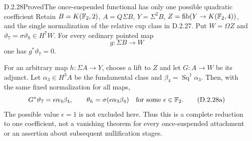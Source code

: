 \begin{claim}{D.2.28}{Proved}{The once-suspended functional has only one possible quadratic coefficient}
Retain $B=K(\mathbb F_2,2)$, $A=Q\Sigma B$, $Y=\Sigma^2B$,
$Z=\operatorname{fib}(Y\to K(\mathbb F_2,4))$, and the single
normalization of the relative cup class in \textup{D.2.27}.
Put $W=\Omega Z$ and
$\vartheta_7=\sigma\vartheta_8\in H^7W$.
For every ordinary pointed map
\[
 g:\Sigma B\longrightarrow W
\]
one has $g^*\vartheta_7=0$.

For an arbitrary map $h:\Sigma A\to Y$, choose a lift to
$Z$ and let $G:A\to W$ be its adjunct. Let
$\alpha_3\in H^3A$ be the fundamental class and
$\beta_4=\operatorname{Sq}^1\alpha_3$.
Then, with the same fixed normalization for all maps,
\[
 G^*\vartheta_7=\epsilon\alpha_3\beta_4,
 \qquad
 \theta_h=\sigma(\epsilon\alpha_3\beta_4)
       \quad\text{for some }\epsilon\in\mathbb F_2.
 \tag{D.2.28a}
\]
The possible value $\epsilon=1$ is not excluded here.
Thus this is a complete reduction to one coefficient,
not a vanishing theorem for every once-suspended attachment
or an assertion about subsequent nullification stages.
\end{claim}
